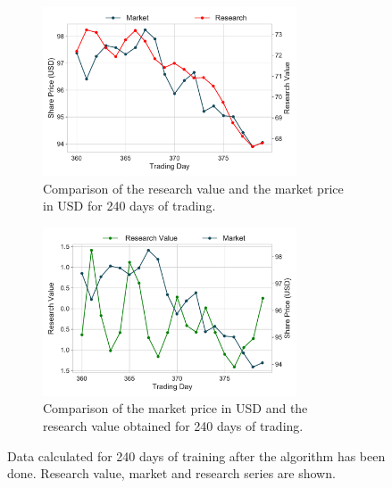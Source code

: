 \documentclass{article}%
\begin{document}
\begin{figure}[H]
\begin{subfigure}{0.48\textwidth}
\centering
    \includegraphics[width=0.9\linewidth, height=5cm]{Market_ResearchSeries_360_380.pdf}
    \caption{Comparison of the research value and the market price in USD for 240 days of trading.}
    \label{fig:20Days-Market_Research}
\end{subfigure}\quad
\begin{subfigure}{0.48\textwidth}
\centering
    \includegraphics[width=0.9\linewidth, height=5cm]{Market_ResearchValue_360_380.pdf}
    \caption{Comparison of the market price in USD and the research value obtained for 240 days of trading.}
    \label{fig:20Days-Market_Research}
\end{subfigure}

    \caption{Data calculated for 240 days of training after the algorithm has been done. Research value, market and research series are shown.}
    \label{fig:20Days}
\end{figure}
\end{document}
